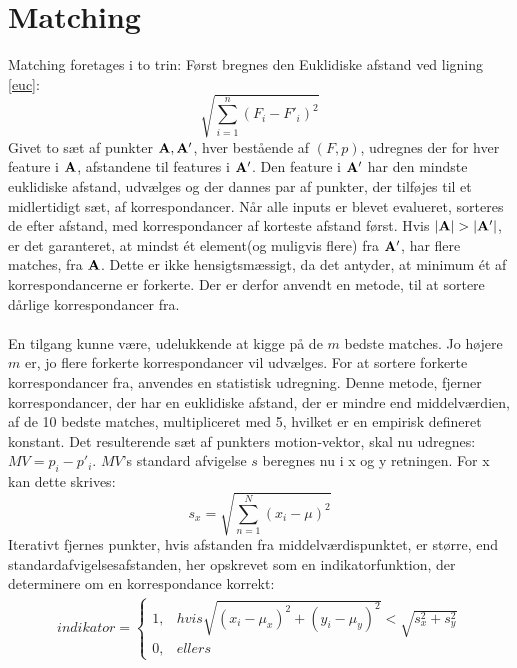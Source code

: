\section{Matching}
\label{sec:match}
Matching foretages i to trin: Først bregnes den Euklidiske afstand ved ligning \eqref{euc}:
\begin{equation}
\sqrt{\sum\limits_{i=1}^n(F_i-F'_i)^2}
\label{euc}
\end{equation}
Givet to sæt af punkter $\bold{A}, \bold{A}'$, hver bestående af $(F, p)$, udregnes der for hver feature i $\bold{A}$, afstandene til features i $\bold{A}'$. Den feature i $\bold{A}'$ har den mindste euklidiske afstand, udvælges og der dannes par af punkter, der tilføjes til et midlertidigt sæt, af korrespondancer. Når alle inputs er blevet evalueret, sorteres de efter afstand, med korrespondancer af korteste afstand først. Hvis $|\bold{A}| > |\bold{A}'|$, er det garanteret, at mindst ét element(og muligvis flere) fra $\bold{A}'$, har flere matches, fra $\bold{A}$. Dette er ikke hensigtsmæssigt, da det antyder, at minimum ét af korrespondancerne er forkerte. Der er derfor anvendt en metode, til at sortere dårlige korrespondancer fra.
\\
\\
En tilgang kunne være, udelukkende at kigge på de $m$ bedste matches. Jo højere $m$ er, jo flere forkerte korrespondancer vil udvælges. For at sortere forkerte korrespondancer fra, anvendes en statistisk udregning. Denne metode, fjerner korrespondancer, der har en euklidiske afstand, der er mindre end middelværdien, af de 10 bedste matches, multipliceret med 5, hvilket er en empirisk defineret konstant. Det resulterende sæt af punkters motion-vektor, skal nu udregnes: $MV = p_i - p'_i$. 
$MV$'s standard afvigelse $s$ beregnes nu i x og y retningen. For x kan dette skrives: 
\begin{equation}
s_x = \sqrt{ \sum \limits_{n=1}^N (x_i  - \mu)^2 }
\label{pis}
\end{equation}
Iterativt fjernes punkter, hvis afstanden fra middelværdispunktet, er større, end standardafvigelsesafstanden, her opskrevet som en indikatorfunktion, der determinere om en korrespondance korrekt:
\begin{equation}
\begin{split}
indikator = 
\begin{cases}
1,&hvis \sqrt{(x_i - \mu_x)^2 + (y_i - \mu_y)^2} < \sqrt{s_x^2 + s_y^2} \\
0,& ellers
\end{cases}
\end{split}
\label{indikator}
\end{equation}
